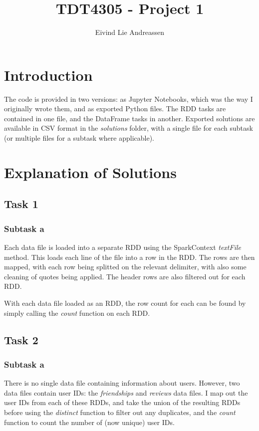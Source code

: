 \documentclass[a4paper]{article}
\title{TDT4305 - Project 1}
\author{Eivind Lie Andreassen}
\begin{document}
\maketitle

\section{Introduction}
The code is provided in two versions: as Jupyter Notebooks, which was the way I originally wrote them, and as exported Python files. The RDD tasks are contained in one file, and the DataFrame tasks in another. Exported solutions are available in CSV format in the \emph{solutions} folder, with a single file for each subtask (or multiple files for a subtask where applicable).

\section{Explanation of Solutions}

\subsection{Task 1}

\subsubsection{Subtask a}
Each data file is loaded into a separate RDD using the SparkContext \emph{textFile} method. This loads each line of the file into a row in the RDD. The rows are then mapped, with each row being splitted on the relevant delimiter, with also some cleaning of quotes being applied. The header rows are also filtered out for each RDD.

With each data file loaded as an RDD, the row count for each can be found by simply calling the \emph{count} function on each RDD.


\subsection{Task 2}

\subsubsection{Subtask a}
There is no single data file containing information about users. However, two data files contain user IDs: the \emph{friendships} and \emph{reviews} data files. I map out the user IDs from each of these RDDs, and take the union of the resulting RDDs before using the \emph{distinct} function to filter out any duplicates, and the \emph{count} function to count the number of (now unique) user IDs.
\end{document}
